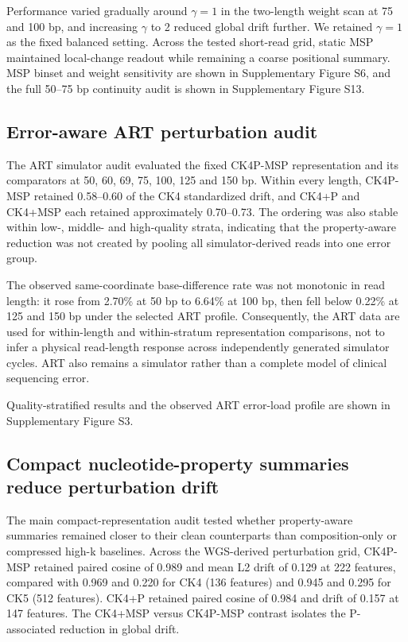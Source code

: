 Performance varied gradually around $\gamma=1$ in the two-length weight scan at 75 and 100 bp, and increasing $\gamma$ to 2 reduced global drift further. We retained $\gamma=1$ as the fixed balanced setting. Across the tested short-read grid, static MSP maintained local-change readout while remaining a coarse positional summary. MSP binset and weight sensitivity are shown in Supplementary Figure S6, and the full 50--75 bp continuity audit is shown in Supplementary Figure S13.

\subsection{Error-aware ART perturbation audit}

The ART simulator audit evaluated the fixed CK4P-MSP representation and its comparators at 50, 60, 69, 75, 100, 125 and 150 bp. Within every length, CK4P-MSP retained 0.58--0.60 of the CK4 standardized drift, and CK4+P and CK4+MSP each retained approximately 0.70--0.73. The ordering was also stable within low-, middle- and high-quality strata, indicating that the property-aware reduction was not created by pooling all simulator-derived reads into one error group.

The observed same-coordinate base-difference rate was not monotonic in read length: it rose from 2.70\% at 50 bp to 6.64\% at 100 bp, then fell below 0.22\% at 125 and 150 bp under the selected ART profile. Consequently, the ART data are used for within-length and within-stratum representation comparisons, not to infer a physical read-length response across independently generated simulator cycles. ART also remains a simulator rather than a complete model of clinical sequencing error.

Quality-stratified results and the observed ART error-load profile are shown in Supplementary Figure S3.

\subsection{Compact nucleotide-property summaries reduce perturbation drift}

The main compact-representation audit tested whether property-aware summaries remained closer to their clean counterparts than composition-only or compressed high-k baselines. Across the WGS-derived perturbation grid, CK4P-MSP retained paired cosine of 0.989 and mean L2 drift of 0.129 at 222 features, compared with 0.969 and 0.220 for CK4 (136 features) and 0.945 and 0.295 for CK5 (512 features). CK4+P retained paired cosine of 0.984 and drift of 0.157 at 147 features. The CK4+MSP versus CK4P-MSP contrast isolates the P-associated reduction in global drift.

